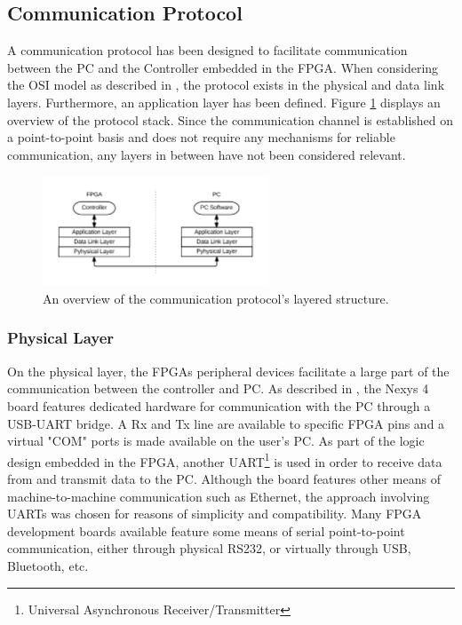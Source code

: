 \documentclass[main.tex]{subfiles}
\begin{document}


\subsection{Communication Protocol}
\label{section:communication-protocol}
A communication protocol has been designed to facilitate communication between the PC and the Controller embedded in the FPGA. When considering the OSI model as described in \cite[p.28]{tanenbaumcomputer}, the protocol exists in the physical and data link layers. Furthermore, an application layer has been defined. Figure \ref{fig:communication-osi} displays an overview of the protocol stack. Since the communication channel is established on a point-to-point basis and does not require any mechanisms for reliable communication, any layers in between have not been considered relevant.

\begin{figure}[h]
\centering
\includegraphics[width=0.6\textwidth]{img/communication-osi}
\caption{An overview of the communication protocol's layered structure.}
\label{fig:communication-osi}
\end{figure}

\subsubsection{Physical Layer}

On the physical layer, the FPGAs peripheral devices facilitate a large part of the communication between the controller and PC. As described in \cite[p.9]{nexys4reference}, the Nexys 4 board features dedicated hardware for communication with the PC through a USB-UART bridge. A Rx and Tx line are available to specific FPGA pins and a virtual "COM" ports is made available on the user's PC. As part of the logic design embedded in the FPGA, another UART\footnote{Universal Asynchronous Receiver/Transmitter} is used in order to receive data from and transmit data to the PC. Although the board features other means of machine-to-machine communication such as Ethernet, the approach involving UARTs was chosen for reasons of simplicity and compatibility. Many FPGA development boards available feature some means of serial point-to-point communication, either through physical RS232, or virtually through USB, Bluetooth, etc.
\end{document}
